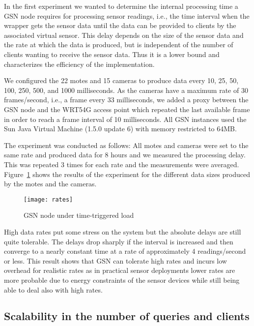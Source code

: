 In the first experiment we wanted to determine the internal processing time a
GSN node requires for processing sensor readings, i.e., the time interval when
the wrapper gets the sensor data until the data can be provided to clients by
the associated virtual sensor. This delay depends on the size of the sensor
data and the rate at which the data is produced, but is independent of the
number of clients wanting to receive the sensor data. Thus it is a lower bound
and characterizes the efficiency of the implementation. 

We configured the 22 motes and 15 cameras to produce data every 10, 25, 50,
100, 250, 500, and 1000 milliseconds. As the cameras have a maximum rate of 30
frames/second, i.e., a frame every 33 milliseconds, we added a proxy between
the GSN node and the WRT54G access point which repeated the last available
frame in order to reach a frame interval of 10 milliseconds. All GSN instances
used the Sun Java Virtual Machine (1.5.0 update 6) with memory restricted to
64MB.

The experiment was conducted as follows: All motes and cameras were set to the
same rate and produced data for 8 hours and we measured the processing delay.
This was repeated 3 times for each rate and the measurements were averaged.
Figure~\ref{fig:TimeTriggeredLoad} shows the results of the experiment for the
different data sizes produced by the motes and the cameras.

\begin{figure}%
  \centering
  \texttt{[image: rates]}
  \caption{GSN node under time-triggered load}
  \label{fig:TimeTriggeredLoad}
\end{figure}

High data rates put some stress on the system but the absolute delays are still
quite tolerable. The delays drop sharply if the interval is increased and then
converge to a nearly constant time at a rate of approximately 4 readings/second
or less. This result shows that GSN can tolerate high rates and incurs low
overhead for realistic rates as in practical sensor deployments lower rates are
more probable due to energy constraints of the sensor devices while still being
able to deal also with high rates.


\subsection{Scalability in the number of queries and clients}
\label{sec:scal-towards-numb}

